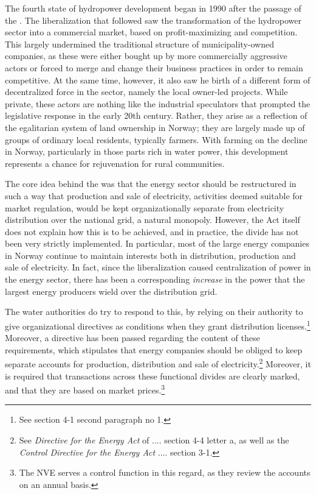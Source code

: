The fourth state of hydropower development began in 1990 after the passage of the \cite{ea90}. The liberalization that followed saw the transformation of the hydropower sector into a commercial market, based on profit-maximizing and competition. This largely undermined the traditional structure of municipality-owned companies, as these were either bought up by more commercially aggressive actors or forced to merge and change their business practices in order to remain competitive. At the same time, however, it also saw he birth of a different form of decentralized force in the sector, namely the local owner-led projects. While private, these actors are nothing like the industrial speculators that prompted the legislative response in the early 20th century. Rather, they arise as a reflection of the egalitarian system of land ownership in Norway; they are largely made up of groups of ordinary local residents, typically farmers. With farming on the decline in Norway, particularly in those parts rich in water power, this development represents a chance for rejuvenation for rural communities. 

The core idea behind the \cite{ea90} was that the energy sector should be restructured in such a way that production and sale of electricity, activities deemed suitable for market regulation, would be kept organizationally separate from electricity distribution over the national grid, a natural monopoly. However, the Act itself does not explain how this is to be achieved, and in practice, the divide has not been very strictly implemented. In particular, most of the large energy companies in Norway continue to maintain interests both in distribution, production and sale of electricity. In fact, since the liberalization caused centralization of power in the energy sector, there has been a corresponding {\it increase} in the power that the largest energy producers wield over the distribution grid. 

The water authorities do try to respond to this, by relying on their authority to give organizational directives as conditions when they grant distribution licenses.\footnote{See \cite{ea90} section 4-1 second paragraph no 1.} Moreover, a directive has been passed regarding the content of these requirements, which stipulates that energy companies should  be obliged to keep separate accounts for production, distribution and sale of electricity.\footnote{See {\it Directive for the Energy Act} of .... section 4-4 letter a, as well as the {\it Control Directive for the Energy Act}  .... section 3-1.} Moreover, it is required that transactions across these functional divides are clearly marked, and that they are based on market prices.\footnote{The NVE serves a control function in this regard, as they review the accounts on an annual basis.} 

